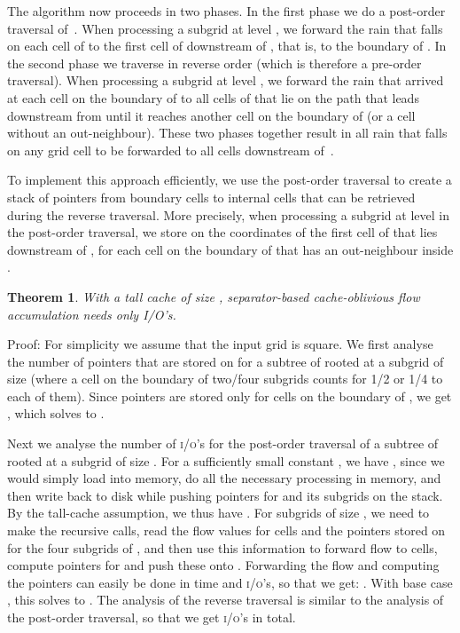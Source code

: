 \documentclass[10pt,a4paper]{article}
\newtheorem{theorem}{Theorem}
\newenvironment{proof}{Proof:}{\qed}
\def\squareforqed{\hbox{\rlap{}}}
\def\qed{\ifmmode\squareforqed\else{\unskip\nobreak\hfil
\penalty50\hskip1em\null\nobreak\hfil\squareforqed
\parfillskip=0pt\finalhyphendemerits=0\endgraf}\fi}
\def\ios{\textsc{i/o}'s\xspace}
\begin{document}
The algorithm now proceeds in two phases. In the first phase we do a post-order traversal of~. When processing a subgrid  at level , we forward the rain that falls on each cell  of  to the first cell of  downstream of , that is, to the boundary of . In the second phase we traverse  in reverse order (which is therefore a pre-order traversal). When processing a subgrid  at level , we forward the rain that arrived at each cell  on the boundary of  to all cells of  that lie on the path that leads downstream from  until it reaches another cell on the boundary of  (or a cell without an out-neighbour). These two phases together result in all rain that falls on any grid cell  to be forwarded to all cells downstream of~.

To implement this approach efficiently, we use the post-order traversal to create a stack  of pointers from boundary cells to internal cells that can be retrieved during the reverse traversal. More precisely, when processing a subgrid  at level  in the post-order traversal, we store on  the coordinates of the first cell of  that lies downstream of , for each cell  on the boundary of  that has an out-neighbour inside .

\begin{theorem}\label{CacheAwareAccumulation}
With a tall cache of size , separator-based cache-oblivious flow accumulation needs only  I/O's.
\end{theorem}
\begin{proof}
For simplicity we assume that the input grid is square.
We first analyse the number of pointers  that are stored on  for a subtree of  rooted at a subgrid  of size  (where a cell on the boundary of two/four subgrids counts for 1/2 or 1/4 to each of them). Since pointers are stored only for cells on the boundary of , we get , which solves to .

Next we analyse the number of \ios  for the post-order traversal of a subtree of  rooted at a subgrid  of size . For a sufficiently small constant , we have , since we would simply load  into memory, do all the necessary processing in memory, and then write  back to disk while  pushing  pointers for  and its subgrids on the stack. By the tall-cache assumption, we thus have . For subgrids  of size , we need to make the recursive calls, read the flow values for  cells and the  pointers stored on  for the four subgrids of , and then use this information to forward flow to  cells, compute  pointers for  and push these onto . Forwarding the flow and computing the pointers can easily be done in  time and \ios, so that we get: .
With base case , this solves to .
The analysis of the reverse traversal is similar to the analysis of the post-order traversal, so that we get  \ios in total.
\end{proof}
\end{document}
